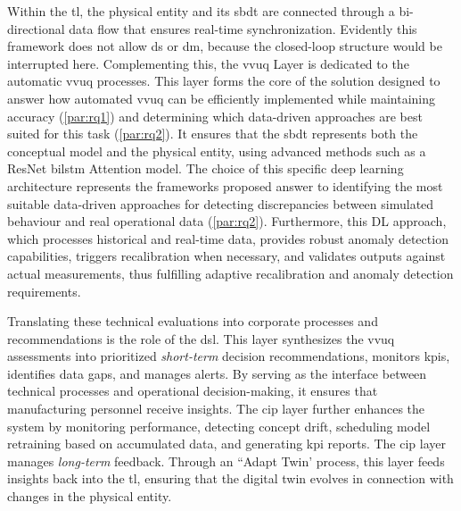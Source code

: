 Within the \gls{tl}, the physical entity and its \gls{sbdt} are connected through a bi-directional data flow that ensures real-time synchronization. Evidently this framework does not allow \gls{ds} or \gls{dm}, because the closed-loop structure would be interrupted here. Complementing this, the \gls{vvuq} Layer is dedicated to the automatic \gls{vvuq} processes. This layer forms the core of the solution designed to answer how automated \gls{vvuq} can be efficiently implemented while maintaining accuracy (\autoref{par:rq1}) and determining which data-driven approaches are best suited for this task (\autoref{par:rq2}). It ensures that the \gls{sbdt} represents both the conceptual model and the physical entity, using advanced methods such as a ResNet \gls{bilstm} Attention model. The choice of this specific deep learning architecture represents the frameworks proposed answer to identifying the most suitable data-driven approaches for detecting discrepancies between simulated behaviour and real operational data (\autoref{par:rq2}). Furthermore, this DL approach, which processes historical and real-time data, provides robust anomaly detection capabilities, triggers recalibration when necessary, and validates outputs against actual measurements, thus fulfilling adaptive recalibration and anomaly detection requirements.

Translating these technical evaluations into corporate processes and recommendations is the role of the \gls{dsl}. This layer synthesizes the \gls{vvuq} assessments into prioritized \textit{short-term} decision recommendations, monitors \gls{kpi}s, identifies data gaps, and manages alerts. By serving as the interface between technical processes and operational decision-making, it ensures that manufacturing personnel receive insights. The \gls{cip} layer further enhances the system by monitoring performance, detecting concept drift, scheduling model retraining based on accumulated data, and generating \gls{kpi} reports. The \gls{cip} layer manages \textit{long-term} feedback. Through an ``Adapt Twin' process, this layer feeds insights back into the \gls{tl}, ensuring that the digital twin evolves in connection with changes in the physical entity.

